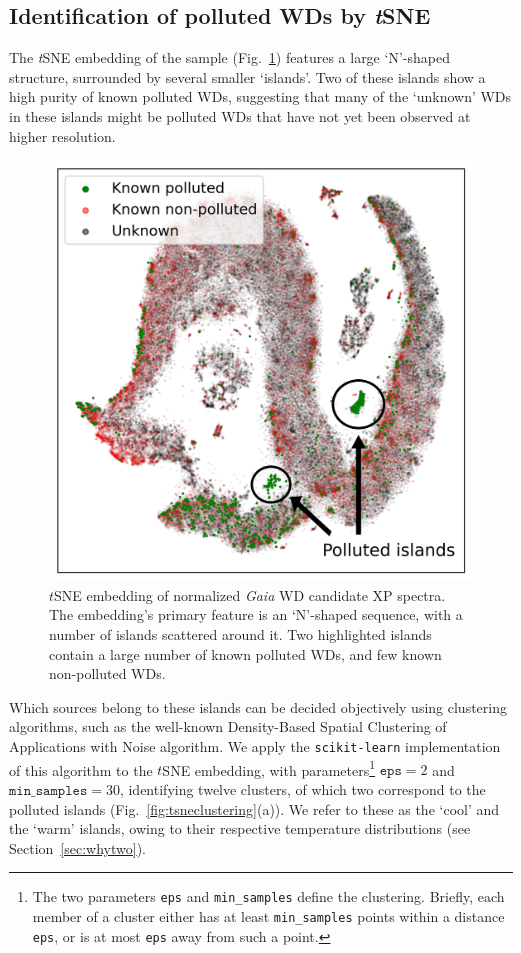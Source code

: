 \documentclass[fleqn,usenatbib]{rasti}
\begin{document}
\subsection{Identification of polluted WDs by \textit{t}SNE} \label{sec:results/tsne}

The \textit{t}SNE embedding of the sample (Fig.~\ref{fig:tsneembedding}) features a large `N'-shaped structure, surrounded by several smaller `islands'.
Two of these islands show a high purity of known polluted WDs, suggesting that many of the `unknown' WDs in these islands might be polluted WDs that have not yet been observed at higher resolution.

\begin{figure}
\centering
\includegraphics[width=\columnwidth]{figures/fig1_tsneembedding.png}
\caption{
    $t$SNE embedding of normalized \textit{Gaia} WD candidate XP spectra.
    The embedding's primary feature is an `N'-shaped sequence, with a number of islands scattered around it.
    Two highlighted islands contain a large number of known polluted WDs, and few known non-polluted WDs.
}
\label{fig:tsneembedding}
\end{figure}

Which sources belong to these islands can be decided objectively using clustering algorithms, such as the well-known Density-Based Spatial Clustering of Applications with Noise \citep[DBSCAN;][]{ester96} algorithm.
We apply the \texttt{scikit-learn} implementation of this algorithm to the $t$SNE embedding, with parameters\footnote{
    The two parameters \texttt{eps} and \texttt{min\_samples} define the clustering.
    Briefly, each member of a cluster either has at least \texttt{min\_samples} points within a distance \texttt{eps}, or is at most \texttt{eps} away from such a point.
} $\mathtt{eps}=2$ and $\mathtt{min\_samples}=30$, identifying twelve clusters, of which two correspond to the polluted islands (Fig.~\ref{fig:tsneclustering}(a)).
We refer to these as the `cool' and the `warm' islands, owing to their respective temperature distributions (see Section~\ref{sec:whytwo}).
\end{document}
